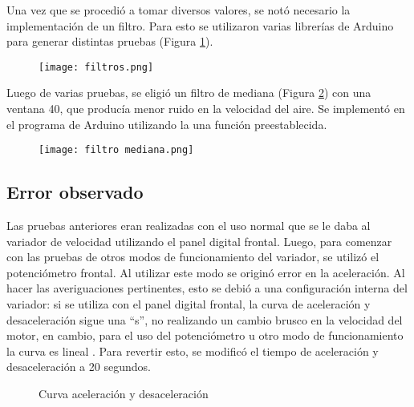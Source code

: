 Una vez que se procedió a tomar diversos valores, se notó necesario la implementación de un filtro. Para esto se utilizaron varias librerías de Arduino para generar distintas pruebas (Figura \ref{fig:filtros}). 

\begin{figure}[htb]
	\centering
	\texttt{[image: filtros.png]}
	\label{fig:filtros}
\end{figure}

Luego de varias pruebas, se eligió un filtro de mediana (Figura \ref{fig:filtrosm}) con una ventana 40, que producía menor ruido en la velocidad del aire. Se implementó en el programa de Arduino utilizando la una función preestablecida.

\begin{figure}[htb]
	\centering
	\texttt{[image: filtro mediana.png]}
	\label{fig:filtrosm}
\end{figure}


\subsection{Error observado}
Las pruebas anteriores eran realizadas con el uso normal que se le daba al variador de velocidad utilizando el panel digital frontal.
Luego, para comenzar con las pruebas de otros modos de funcionamiento del variador, se utilizó el potenciómetro frontal. Al utilizar este modo se originó error en la aceleración.   Al hacer las averiguaciones pertinentes, esto se debió a una configuración interna del variador: si se utiliza con el panel digital frontal, la curva de aceleración y desaceleración sigue una “s”, no realizando un cambio brusco en la velocidad del motor, en cambio, para el uso del potenciómetro u otro modo de funcionamiento la curva es lineal . Para revertir esto, se modificó el tiempo de aceleración y desaceleración a 20 segundos. 

\begin{figure}[htbp]
    \centering
    \caption{Curva aceleración y desaceleración} \label{fig:curva}
	\end{figure}


\newpage
